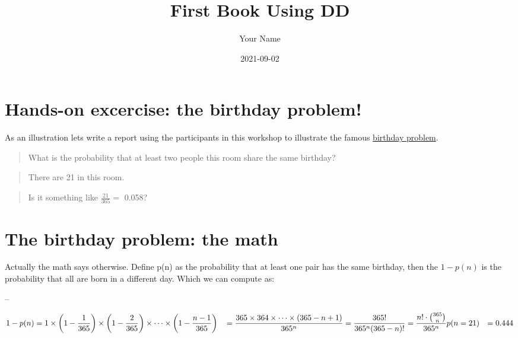 \documentclass[
]{book}
\title{First Book Using DD}
\author{Your Name}
\date{2021-09-02}
\begin{document}
\maketitle

{
\setcounter{tocdepth}{1}
\tableofcontents
}
\hypertarget{hands-on-excercise-the-birthday-problem}{%
\chapter{Hands-on excercise: the birthday problem!}\label{hands-on-excercise-the-birthday-problem}}

As an illustration lets write a report using the participants in this workshop to illustrate the famous \href{https://en.wikipedia.org/wiki/Birthday_problem}{birthday problem}.

\begin{quote}
What is the probability that at least two people this room share the same birthday?
\end{quote}

\begin{quote}
There are 21 in this room.
\end{quote}

\begin{quote}
Is it something like \(\frac{21}{365} =\) 0.058?
\end{quote}

\hypertarget{the-birthday-problem-the-math}{%
\chapter{The birthday problem: the math}\label{the-birthday-problem-the-math}}

Actually the math says otherwise. Define p(n) as the probability that at least one pair has the same birthday, then the \(1 - p(n)\) is the probability that all are born in a different day. Which we can compute as:

--

\begin{align} 
 1 -  p(n) &= 1 \times \left(1-\frac{1}{365}\right) \times \left(1-\frac{2}{365}\right) \times \cdots \times \left(1-\frac{n-1}{365}\right) \nonumber  \newline
 &= \frac{ 365 \times 364 \times \cdots \times (365-n+1) }{ 365^n } \nonumber \newline
 &= \frac{ 365! }{ 365^n (365-n)!} = \frac{n!\cdot\binom{365}{n}}{365^n}\newline
p(n= 21) &= 0.444  \nonumber
\end{align}
\end{document}
